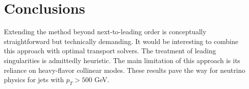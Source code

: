 \section{Conclusions}\label{sec:conclusions}

Extending the method beyond next-to-leading order is conceptually
straightforward but technically demanding. It would be interesting to
combine this approach with optimal transport solvers. The treatment of
leading singularities is admittedly heuristic. The main limitation of
this approach is its reliance on heavy-flavor collinear modes. These
results pave the way for neutrino physics for jets with $p_T > 500$ GeV.

